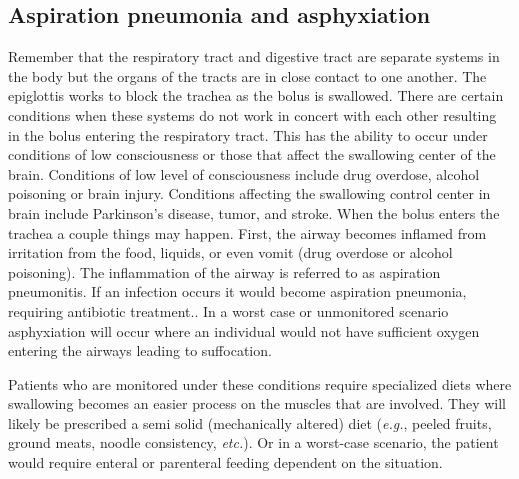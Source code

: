 \documentclass{tufte-handout}
\begin{document}
\subsection{Aspiration pneumonia and asphyxiation}
Remember that the respiratory tract and digestive tract are separate systems in the body but the organs of the tracts are in close contact to one another. The epiglottis works to block the trachea as the bolus is swallowed. There are certain conditions when these systems do not work in concert with each other resulting in the bolus entering the respiratory tract. This has the ability to occur under conditions of low consciousness or those that affect the swallowing center of the brain. Conditions of low level of consciousness include drug overdose, alcohol poisoning or brain injury. Conditions affecting the swallowing control center in brain include Parkinson's disease, tumor, and stroke. When the bolus enters the trachea a couple things may happen. First, the airway becomes inflamed from irritation from the food, liquids, or even vomit (drug overdose or alcohol poisoning). The inflammation of the airway is referred to as aspiration pneumonitis. If an infection occurs it would become aspiration pneumonia, requiring antibiotic treatment.. In a worst case or unmonitored scenario asphyxiation will occur where an individual would not have sufficient oxygen entering the airways leading to suffocation.  

Patients who are monitored under these conditions require specialized diets where swallowing becomes an easier process on the muscles that are involved. They will likely be prescribed a semi solid (mechanically altered) diet (\textit{e.g.}, peeled fruits, ground meats, noodle consistency, \textit{etc.}). Or in a worst-case scenario, the patient would require enteral or parenteral feeding dependent on the situation. 



\end{document}
